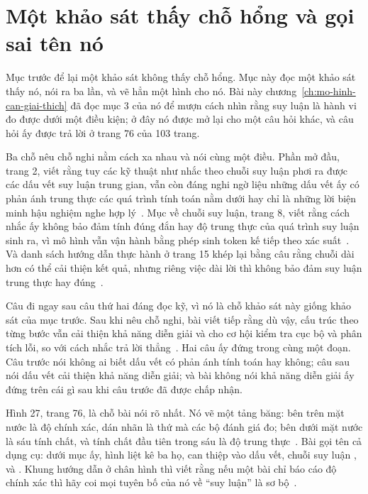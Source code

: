 \section{Một khảo sát thấy chỗ hổng và gọi sai tên nó}
\label{sec:ch17-khao-sat-biet-cho-hong}

%
Mục trước để lại một khảo sát không thấy chỗ hổng. Mục này đọc một khảo sát thấy
nó, nói ra ba lần, và vẽ hẳn một hình cho nó. Bài này
chương~\ref{ch:mo-hinh-can-giai-thich} đã đọc mục 3 của nó để mượn cách nhìn
rằng suy luận là hành vi đo được dưới một điều kiện; ở đây nó được mở lại cho
một câu hỏi khác, và câu hỏi ấy được trả lời ở trang 76 của 103 trang.

%
Ba chỗ nêu chỗ nghi nằm cách xa nhau và nói cùng một điều. Phần mở đầu, trang 2,
viết rằng tuy các kỹ thuật như nhắc theo chuỗi suy luận phơi ra được các dấu vết
suy luận trung gian, vẫn còn đáng nghi ngờ liệu những dấu vết ấy có phản ánh
trung thực các quá trình tính toán nằm dưới hay chỉ là những lời biện minh hậu
nghiệm nghe hợp lý~\autocite{p08periodic}. Mục về chuỗi suy luận, trang 8, viết
rằng cách nhắc ấy không bảo đảm tính đúng đắn hay độ trung thực của quá trình
suy luận sinh ra, vì mô hình vẫn vận hành bằng phép sinh token kế tiếp theo xác
suất~\autocite{p08periodic}. Và danh sách hướng dẫn thực hành ở trang 15 khép
lại bằng câu rằng chuỗi dài hơn có thể cải thiện kết quả, nhưng riêng việc dài
lời thì không bảo đảm suy luận trung thực hay đúng~\autocite{p08periodic}.

Câu đi ngay sau câu thứ hai đáng đọc kỹ, vì nó là chỗ khảo sát này giống khảo
sát của mục trước. Sau khi nêu chỗ nghi, bài viết tiếp rằng dù vậy, cấu trúc
theo từng bước vẫn cải thiện khả năng diễn giải và cho cơ hội kiểm tra cục bộ và
phân tích lỗi, so với cách nhắc trả lời thẳng~\autocite{p08periodic}. Hai câu
ấy đứng trong cùng một đoạn. Câu trước nói không ai biết dấu vết có phản ánh
tính toán hay không; câu sau nói dấu vết cải thiện khả năng diễn giải; và bài
không nói khả năng diễn giải ấy đứng trên cái gì sau khi câu trước đã được chấp
nhận.

%
Hình 27, trang 76, là chỗ bài nói rõ nhất. Nó vẽ một tảng băng: bên trên mặt
nước là độ chính xác, dán nhãn là thứ mà các bộ đánh giá đo; bên dưới mặt nước
là sáu tính chất, và tính chất đầu tiên trong sáu là độ trung
thực~\autocite{p08periodic}. Bài gọi tên cả dụng cụ: dưới mục ấy, hình liệt kê
ba họ, can thiệp vào dấu vết, chuỗi suy luận , và
. Khung hướng dẫn ở chân hình thì viết rằng nếu một bài chỉ báo cáo độ
chính xác thì hãy coi mọi tuyên bố của nó về \enquote{suy luận} là sơ
bộ~\autocite{p08periodic}.

